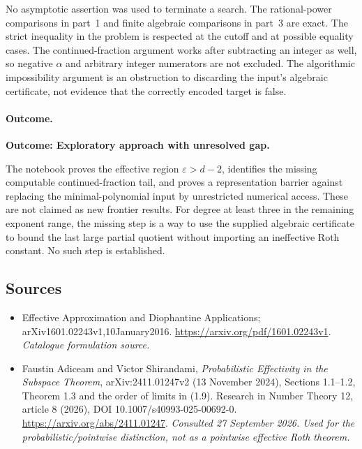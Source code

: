 \documentclass[11pt,a4paper]{article}
\newcommand{\eps}{\varepsilon}
\begin{document}
No asymptotic assertion was used to terminate a search. The rational-power
comparisons in part~1 and finite algebraic comparisons in part~3 are exact.
The strict inequality in the problem is respected at the cutoff and at
possible equality cases. The continued-fraction argument works after
subtracting an integer as well, so negative $\alpha$ and arbitrary integer
numerators are not excluded. The algorithmic impossibility argument is an
obstruction to discarding the input's algebraic certificate, not evidence
that the correctly encoded target is false.

\paragraph{Outcome.}
\textbf{Outcome: Exploratory approach with unresolved gap.}

The notebook proves the effective region $\eps>d-2$, identifies the missing
computable continued-fraction tail, and proves a representation barrier
against replacing the minimal-polynomial input by unrestricted numerical
access. These are not claimed as new frontier results. For degree at least
three in the remaining exponent range, the missing step is a way to use
the supplied algebraic certificate to bound the last large partial quotient
without importing an ineffective Roth constant. No such step is established.
\subsection{Sources}
\begin{itemize}\raggedright
\item[\textnormal{[S1]}]\hypertarget{source:30006790:1}{} Effective Approximation and Diophantine Applications; arXiv1601.02243v1,10January2016.
\url{https://arxiv.org/pdf/1601.02243v1}.
{\small\textit{Catalogue formulation source.}}
\item[\textnormal{[E1]}]\hypertarget{extra:30006790:1}{} Faustin Adiceam and Victor Shirandami,
\emph{Probabilistic Effectivity in the Subspace Theorem},
arXiv:2411.01247v2 (13 November 2024), Sections 1.1--1.2, Theorem 1.3
and the order of limits in (1.9). Research in Number Theory 12, article 8 (2026),
DOI 10.1007/s40993-025-00692-0.
\url{https://arxiv.org/abs/2411.01247}.
{\small\textit{Consulted 27 September 2026. Used for the probabilistic/pointwise distinction, not as a pointwise effective Roth theorem.}}
\end{itemize}
\end{document}

